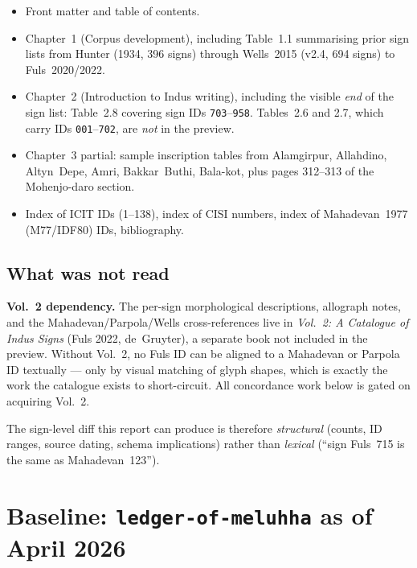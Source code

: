 \documentclass[12pt, a4paper]{article}
\newcommand{\sigid}[1]{\texttt{#1}}
\begin{document}
\begin{itemize}[leftmargin=1.6em, itemsep=2pt]
\item Front matter and table of contents.
\item Chapter~1 (Corpus development), including Table~1.1
      summarising prior sign lists from Hunter (1934, 396 signs)
      through Wells~2015 (v2.4, 694 signs) to Fuls~2020/2022.
\item Chapter~2 (Introduction to Indus writing), including the
      visible \emph{end} of the sign list: Table~2.8 covering
      sign IDs \sigid{703}--\sigid{958}.
      Tables~2.6 and 2.7, which carry IDs \sigid{001}--\sigid{702},
      are \emph{not} in the preview.
\item Chapter~3 partial: sample inscription tables from
      Alamgirpur, Allahdino, Altyn~Depe, Amri, Bakkar~Buthi,
      Bala-kot, plus pages 312--313 of the Mohenjo-daro section.
\item Index of ICIT IDs (1--138), index of CISI numbers,
      index of Mahadevan~1977 (M77/IDF80) IDs, bibliography.
\end{itemize}

\subsection{What was not read}

\begin{caveat}
\textbf{Vol.~2 dependency.}\enspace
The per-sign morphological descriptions, allograph notes,
and the Mahadevan/Parpola/Wells cross-references live in
\textit{Vol.~2: A Catalogue of Indus Signs} (Fuls 2022,
de~Gruyter), a separate book not included in the preview.
Without Vol.~2, no Fuls ID can be aligned to a Mahadevan or
Parpola ID textually --- only by visual matching of glyph
shapes, which is exactly the work the catalogue exists to
short-circuit.  All concordance work below is gated on
acquiring Vol.~2.
\end{caveat}

The sign-level diff this report can produce is therefore
\emph{structural} (counts, ID ranges, source dating, schema
implications) rather than \emph{lexical} (``sign Fuls~715 is
the same as Mahadevan~123'').

\section{Baseline: \texttt{ledger-of-meluhha} as of April 2026}
\label{sec:baseline}
\end{document}
